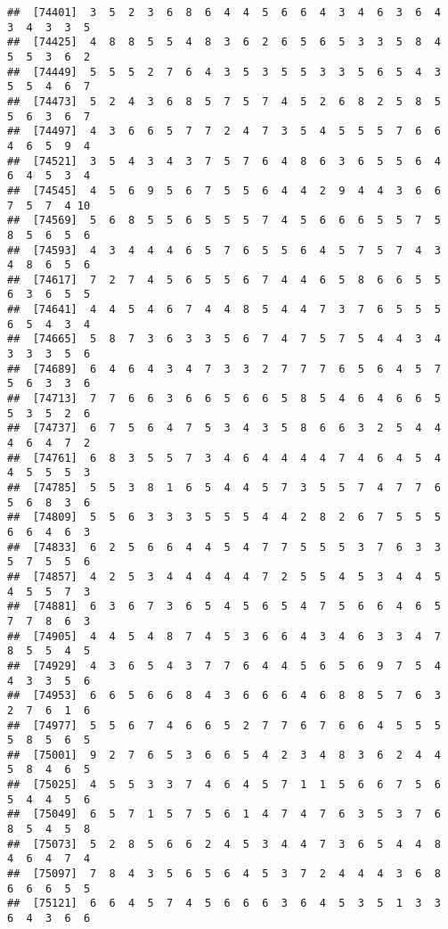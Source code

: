 \documentclass[
]{book}
\begin{document}
\begin{verbatim}
##  [74401]  3  5  2  3  6  8  6  4  4  5  6  6  4  3  4  6  3  6  4  3  4  3  3  5
##  [74425]  4  8  8  5  5  4  8  3  6  2  6  5  6  5  3  3  5  8  4  5  5  3  6  2
##  [74449]  5  5  5  2  7  6  4  3  5  3  5  5  3  3  5  6  5  4  3  5  5  4  6  7
##  [74473]  5  2  4  3  6  8  5  7  5  7  4  5  2  6  8  2  5  8  5  5  6  3  6  7
##  [74497]  4  3  6  6  5  7  7  2  4  7  3  5  4  5  5  5  7  6  6  4  6  5  9  4
##  [74521]  3  5  4  3  4  3  7  5  7  6  4  8  6  3  6  5  5  6  4  6  4  5  3  4
##  [74545]  4  5  6  9  5  6  7  5  5  6  4  4  2  9  4  4  3  6  6  7  5  7  4 10
##  [74569]  5  6  8  5  5  6  5  5  5  7  4  5  6  6  6  5  5  7  5  8  5  6  5  6
##  [74593]  4  3  4  4  4  6  5  7  6  5  5  6  4  5  7  5  7  4  3  4  8  6  5  6
##  [74617]  7  2  7  4  5  6  5  5  6  7  4  4  6  5  8  6  6  5  5  6  3  6  5  5
##  [74641]  4  4  5  4  6  7  4  4  8  5  4  4  7  3  7  6  5  5  5  6  5  4  3  4
##  [74665]  5  8  7  3  6  3  3  5  6  7  4  7  5  7  5  4  4  3  4  3  3  3  5  6
##  [74689]  6  4  6  4  3  4  7  3  3  2  7  7  7  6  5  6  4  5  7  5  6  3  3  6
##  [74713]  7  7  6  6  3  6  6  5  6  6  5  8  5  4  6  4  6  6  5  5  3  5  2  6
##  [74737]  6  7  5  6  4  7  5  3  4  3  5  8  6  6  3  2  5  4  4  4  6  4  7  2
##  [74761]  6  8  3  5  5  7  3  4  6  4  4  4  4  7  4  6  4  5  4  4  5  5  5  3
##  [74785]  5  5  3  8  1  6  5  4  4  5  7  3  5  5  7  4  7  7  6  5  6  8  3  6
##  [74809]  5  5  6  3  3  3  5  5  5  4  4  2  8  2  6  7  5  5  5  6  6  4  6  3
##  [74833]  6  2  5  6  6  4  4  5  4  7  7  5  5  5  3  7  6  3  3  5  7  5  5  6
##  [74857]  4  2  5  3  4  4  4  4  4  7  2  5  5  4  5  3  4  4  5  4  5  5  7  3
##  [74881]  6  3  6  7  3  6  5  4  5  6  5  4  7  5  6  6  4  6  5  7  7  8  6  3
##  [74905]  4  4  5  4  8  7  4  5  3  6  6  4  3  4  6  3  3  4  7  8  5  5  4  5
##  [74929]  4  3  6  5  4  3  7  7  6  4  4  5  6  5  6  9  7  5  4  4  3  3  5  6
##  [74953]  6  6  5  6  6  8  4  3  6  6  6  4  6  8  8  5  7  6  3  2  7  6  1  6
##  [74977]  5  5  6  7  4  6  6  5  2  7  7  6  7  6  6  4  5  5  5  5  8  5  6  5
##  [75001]  9  2  7  6  5  3  6  6  5  4  2  3  4  8  3  6  2  4  4  5  8  4  6  5
##  [75025]  4  5  5  3  3  7  4  6  4  5  7  1  1  5  6  6  7  5  6  5  4  4  5  6
##  [75049]  6  5  7  1  5  7  5  6  1  4  7  4  7  6  3  5  3  7  6  8  5  4  5  8
##  [75073]  5  2  8  5  6  6  2  4  5  3  4  4  7  3  6  5  4  4  8  4  6  4  7  4
##  [75097]  7  8  4  3  5  6  5  6  4  5  3  7  2  4  4  4  3  6  8  6  6  6  5  5
##  [75121]  6  6  4  5  7  4  5  6  6  6  3  6  4  5  3  5  1  3  3  6  4  3  6  6

\end{verbatim}
\end{document}
